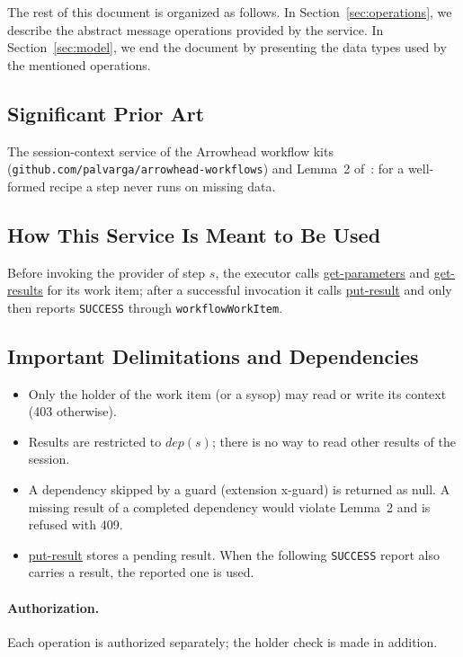 \documentclass[a4paper]{arrowhead}
\newcommand{\oref}[1]{{\textcolor{ArrowheadBlue}{\hyperref[sec:operations:#1]{#1}}}}
\begin{document}
The rest of this document is organized as follows.
In Section~\ref{sec:operations}, we describe the abstract message operations provided by the service.
In Section~\ref{sec:model}, we end the document by presenting the data types used by the mentioned operations.

\subsection{Significant Prior Art}
The session-context service of the Arrowhead workflow kits (\texttt{github.com/palvarga/arrowhead-workflows})
and Lemma~2 of~\cite{varga2026}: for a well-formed recipe a step never runs on missing data.

\subsection{How This Service Is Meant to Be Used}
Before invoking the provider of step $s$, the executor calls \oref{get-parameters} and \oref{get-results}
for its work item; after a successful invocation it calls \oref{put-result} and only then reports \texttt{SUCCESS}
through \texttt{workflowWorkItem}.

\subsection{Important Delimitations and Dependencies}
\label{sec:delimitations}
\begin{itemize}
\item Only the holder of the work item (or a sysop) may read or write its context (403 otherwise).
\item Results are restricted to $dep(s)$; there is no way to read other results of the session.
\item A dependency skipped by a guard (extension x-guard) is returned as null. A missing result of a completed dependency would violate Lemma~2 and is refused with 409.
\item \oref{put-result} stores a pending result. When the following \texttt{SUCCESS} report also carries a result, the reported one is used.
\end{itemize}

\paragraph{Authorization.} Each operation is authorized separately; the holder check is made in addition.
\end{document}
